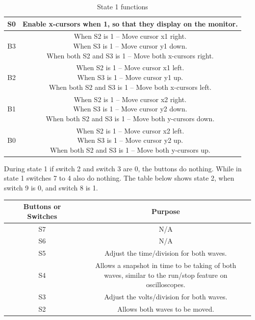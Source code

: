 \documentclass[a4paper,12pt]{article}
\newcommand{\squeezeup}{\vspace{-2.5mm}}
\begin{document}
\begin{flushleft}
\begin{center}
\begin{table}[H]
\begin{tabular}{|c|c|}
	 \\ 
	\hline 
	S0 & Enable x-cursors when 1, so that they display on the monitor. \\ 
	\hline 
	B3 & \makecell{When S2 is 1 – Move cursor x1 right.\\  When S3 is 1 – Move cursor y1 down.\\ When both S2 and S3 is 1 – Move both x-cursors right.}
	 \\ 
	\hline 
	B2 & \makecell{When S2 is 1 – Move cursor x1 left.\\ When S3 is 1 – Move cursor y1 up.\\ When both S2 and S3 is 1 – Move both x-cursors left.}
	 \\ 
	\hline 
	B1 & \makecell{When S2 is 1 – Move cursor x2 right.\\ When S3 is 1 – Move cursor y2 down.\\ When both S2 and S3 is 1 – Move both y-cursors down.} \\ 
	\hline 
	B0 & \makecell{When S2 is 1 – Move cursor x2 left.\\ When S3 is 1 – Move cursor y2 up.\\ When both S2 and S3 is 1 – Move both y-cursors up.}
	 \\ 
	\hline 
	\end{tabular} 
	\caption{State 1 functions}
\end{table}
\end{center}
\squeezeup
During state 1 if switch 2 and switch 3 are 0, the buttons do nothing. While in state 1 switches 7 to 4 also do nothing. The table below shows state 2, when switch 9 is 0, and switch 8 is 1.\\
\begin{center}
\begin{table}[H]
	\centering
	\begin{tabular}{|c|c|}
	\hline 
	\textbf{Buttons or Switches} & \textbf{Purpose} \\ 
	\hline 
	S7 & N/A \\ 
	\hline 
	S6 & N/A \\ 
	\hline 
	S5 & Adjust the time/division for both waves.  \\ 
	\hline 
	S4 & \makecell{Allows a snapshot in time to be taking of both\\ waves, similar to the run/stop feature on oscilloscopes.}  \\ 
	\hline 
	S3 & Adjust the volts/division for both waves. \\ 
	\hline 
	S2 & Allows both waves to be moved. \\ 

\end{tabular}
\end{table}
\end{center}
\end{flushleft}
\end{document}
